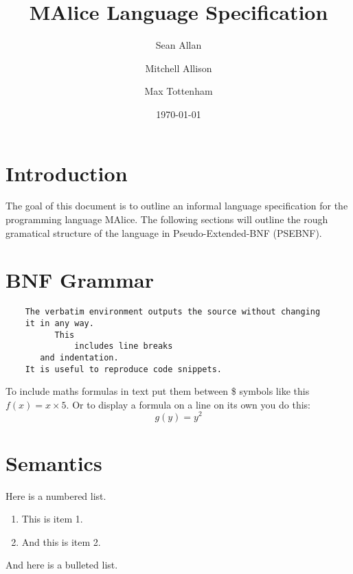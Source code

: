 \documentclass[a4wide, 11pt]{article}
\begin{document}
\title{MAlice Language Specification}

\author{Sean Allan \and Mitchell Allison \and Max Tottenham}

\date{\today}         %

\maketitle            %

\section{Introduction}

The goal of this document is to outline an informal language specification for 
the programming language MAlice. The following sections will outline the rough
gramatical structure of the language in Pseudo-Extended-BNF (PSEBNF). 

\section{BNF Grammar} 

\begin{verbatim}
    The verbatim environment outputs the source without changing
    it in any way. 
          This
              includes line breaks
       and indentation. 
    It is useful to reproduce code snippets.
\end{verbatim}

To include maths formulas in text put them between \$ symbols like this
$f(x) = x \times 5$.
Or to display a formula on a line on its own you do this:
\[
    g(y) = y^2
\]

\section{Semantics}

Here is a numbered list.

\begin{enumerate}

    \item
    This is item 1.
    
    \item
    And this is item 2.
    
\end{enumerate}

And here is a bulleted list.
\end{document}
